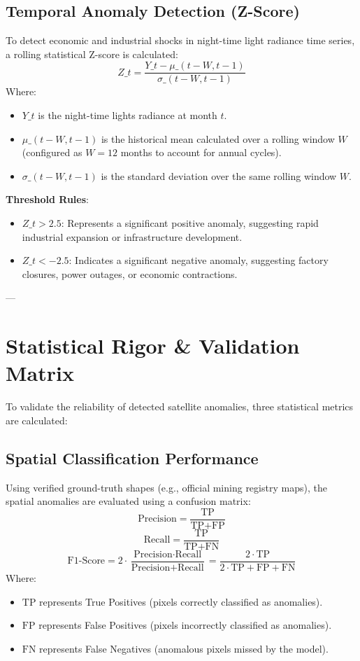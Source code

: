 \subsection{Temporal Anomaly Detection (Z-Score)}
To detect economic and industrial shocks in night-time light radiance time series, a rolling statistical Z-score is calculated:
$$Z\_t = \frac{Y\_t - \mu\_{(t-W, t-1)}}{\sigma\_{(t-W, t-1)}}$$
Where:
\begin{itemize}
  \item $Y\_t$ is the night-time lights radiance at month $t$.
  \item $\mu\_{(t-W, t-1)}$ is the historical mean calculated over a rolling window $W$ (configured as $W = 12$ months to account for annual cycles).
  \item $\sigma\_{(t-W, t-1)}$ is the standard deviation over the same rolling window $W$.

\end{itemize}
\textbf{Threshold Rules}:
\begin{itemize}
  \item $Z\_t > 2.5$: Represents a significant positive anomaly, suggesting rapid industrial expansion or infrastructure development.
  \item $Z\_t < -2.5$: Indicates a significant negative anomaly, suggesting factory closures, power outages, or economic contractions.

\end{itemize}
---

\section{Statistical Rigor \& Validation Matrix}
To validate the reliability of detected satellite anomalies, three statistical metrics are calculated:

\subsection{Spatial Classification Performance}
Using verified ground-truth shapes (e.g., official mining registry maps), the spatial anomalies are evaluated using a confusion matrix:
$$\text{Precision} = \frac{\text{TP}}{\text{TP} + \text{FP}}$$
$$\text{Recall} = \frac{\text{TP}}{\text{TP} + \text{FN}}$$
$$\text{F1-Score} = 2 \cdot \frac{\text{Precision} \cdot \text{Recall}}{\text{Precision} + \text{Recall}} = \frac{2 \cdot \text{TP}}{2 \cdot \text{TP} + \text{FP} + \text{FN}}$$
Where:
\begin{itemize}
  \item $\text{TP}$ represents True Positives (pixels correctly classified as anomalies).
  \item $\text{FP}$ represents False Positives (pixels incorrectly classified as anomalies).
  \item $\text{FN}$ represents False Negatives (anomalous pixels missed by the model).

\end{itemize}
